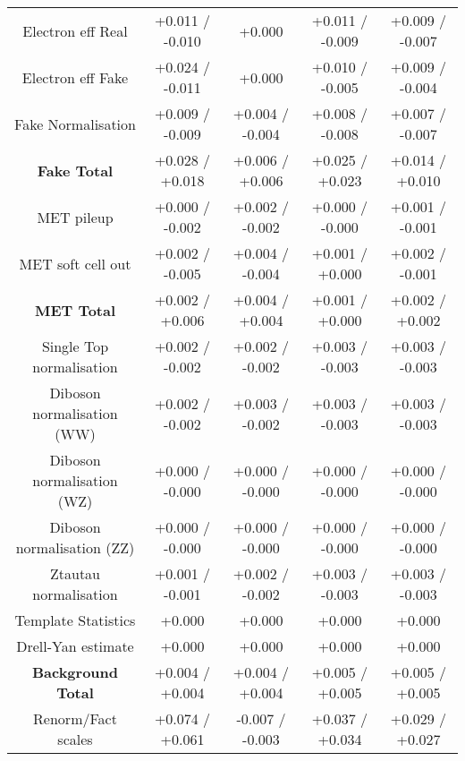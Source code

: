 \begin{table}[htbp]
\begin{center}
\begin{tabular}{|c|c|c|c|c|}
Electron eff Real                     &+0.011   / -0.010   & +0.000              & +0.011   / -0.009   & +0.009   / -0.007  \\
Electron eff Fake                     &+0.024   / -0.011   & +0.000              & +0.010   / -0.005   & +0.009   / -0.004  \\
Fake Normalisation                    &+0.009   / -0.009   & +0.004   / -0.004   & +0.008   / -0.008   & +0.007   / -0.007  \\
\hline
\textbf{Fake Total}                   &+0.028   / +0.018   & +0.006   / +0.006   & +0.025   / +0.023   & +0.014   / +0.010  \\
\hline
MET pileup                            &+0.000   / -0.002   & +0.002   / -0.002   & +0.000   / -0.000   & +0.001   / -0.001  \\
MET soft cell out                     &+0.002   / -0.005   & +0.004   / -0.004   & +0.001   / +0.000   & +0.002   / -0.001  \\
\hline
\textbf{MET Total}                    &+0.002   / +0.006   & +0.004   / +0.004   & +0.001   / +0.000   & +0.002   / +0.002  \\
\hline
Single Top normalisation              &+0.002   / -0.002   & +0.002   / -0.002   & +0.003   / -0.003   & +0.003   / -0.003  \\
Diboson normalisation (WW)            &+0.002   / -0.002   & +0.003   / -0.002   & +0.003   / -0.003   & +0.003   / -0.003  \\
Diboson normalisation (WZ)            &+0.000   / -0.000   & +0.000   / -0.000   & +0.000   / -0.000   & +0.000   / -0.000  \\
Diboson normalisation (ZZ)            &+0.000   / -0.000   & +0.000   / -0.000   & +0.000   / -0.000   & +0.000   / -0.000  \\
Ztautau normalisation                 &+0.001   / -0.001   & +0.002   / -0.002   & +0.003   / -0.003   & +0.003   / -0.003  \\
Template Statistics                   &+0.000              & +0.000              & +0.000              & +0.000             \\
Drell-Yan estimate                    &+0.000              & +0.000              & +0.000              & +0.000             \\
\hline
\textbf{Background Total}             &+0.004   / +0.004   & +0.004   / +0.004   & +0.005   / +0.005   & +0.005   / +0.005  \\
\hline
Renorm/Fact scales                    &+0.074   / +0.061   & -0.007   / -0.003   & +0.037   / +0.034   & +0.029   / +0.027  \\

\end{tabular}
\end{center}
\end{table}
